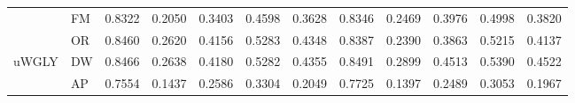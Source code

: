 \begin{sidewaystable}
\begin{tabular}{llccccc|ccccc}
\hline
		& FM &  0.8322&  0.2050&  0.3403&  0.4598& 0.3628& 0.8346&  0.2469&  0.3976&  0.4998&  0.3820\\
		& OR &  0.8460&  0.2620&  0.4156&  0.5283& 0.4348&  0.8387&  0.2390&  0.3863&  0.5215&  0.4137 \\
uWGLY	& DW &  0.8466&  0.2638&  0.4180&  0.5282& 0.4355&  0.8491&  0.2899&  0.4513&  0.5390&  0.4522\\
		& AP & 	0.7554& 	 0.1437& 0.2586 & 0.3304 & 0.2049& 0.7725& 0.1397& 0.2489& 0.3053& 0.1967  \\
\hline
\end{tabular}
\end{sidewaystable}